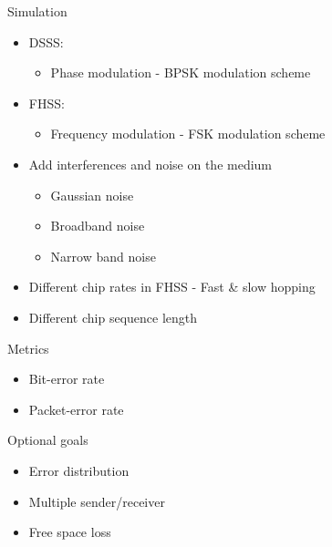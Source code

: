 		\begin{frame}{Simulation}
			\begin{itemize}
				\item<1->
				DSSS:
				\begin{itemize}
				    \item Phase modulation - BPSK modulation scheme
				\end{itemize}
				
				\item<2->
				FHSS:
				\begin{itemize}
				    \item Frequency modulation - FSK modulation scheme
				\end{itemize}
				
				\item<3->
				Add interferences and noise on the medium
				\begin{itemize}
    				\item Gaussian noise
                    \item Broadband noise
                    \item Narrow band noise
				\end{itemize}
				
				\item<4->
				Different chip rates in FHSS - Fast \& slow hopping
				
				\item<5->
				Different chip sequence length
			\end{itemize}
		\end{frame}
		
		\begin{frame}{Metrics}
			\begin{itemize}
				\item<1->
				Bit-error rate
				
				\item<2->
				Packet-error rate
			\end{itemize}
		\end{frame}
        
		\begin{frame}{Optional goals}
			\begin{itemize}
				\item<1->
				Error distribution
				
				\item<2->
				Multiple sender/receiver
				
				\item<3->
				Free space loss
			\end{itemize}
		\end{frame}
		

